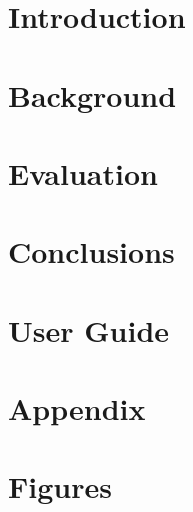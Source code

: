 



\listoftodos



\pagebreak

\chapter{Introduction}


\chapter{Background}


\chapter{Evaluation}


\chapter{Conclusions}


\chapter{User Guide}


\printbibliography

\appendix
\chapter{Appendix}


\chapter{Figures}
\listoffigures



